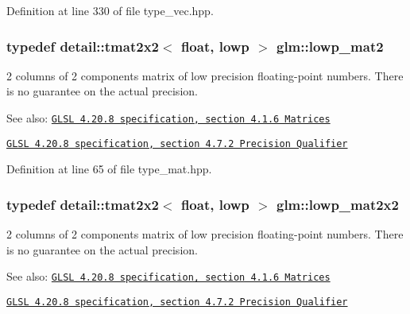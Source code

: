 Definition at line 330 of file type\_\-vec.hpp.\hypertarget{group__core__precision_gc0acc3ccf8da050af3393ea639f698d6}{
\subsubsection[lowp\_\-mat2]{\setlength{\rightskip}{0pt plus 5cm}typedef detail::tmat2x2$<$ float, lowp $>$ {\bf glm::lowp\_\-mat2}}}
\label{group__core__precision_gc0acc3ccf8da050af3393ea639f698d6}


2 columns of 2 components matrix of low precision floating-point numbers. There is no guarantee on the actual precision.

\begin{Desc}
\item[See also:]\href{http://www.opengl.org/registry/doc/GLSLangSpec.4.20.8.pdf}{\tt GLSL 4.20.8 specification, section 4.1.6 Matrices} 

\href{http://www.opengl.org/registry/doc/GLSLangSpec.4.20.8.pdf}{\tt GLSL 4.20.8 specification, section 4.7.2 Precision Qualifier} \end{Desc}


Definition at line 65 of file type\_\-mat.hpp.\hypertarget{group__core__precision_g7d7e123d953978cc17de6882bb10400e}{
\subsubsection[lowp\_\-mat2x2]{\setlength{\rightskip}{0pt plus 5cm}typedef detail::tmat2x2$<$ float, lowp $>$ {\bf glm::lowp\_\-mat2x2}}}
\label{group__core__precision_g7d7e123d953978cc17de6882bb10400e}


2 columns of 2 components matrix of low precision floating-point numbers. There is no guarantee on the actual precision.

\begin{Desc}
\item[See also:]\href{http://www.opengl.org/registry/doc/GLSLangSpec.4.20.8.pdf}{\tt GLSL 4.20.8 specification, section 4.1.6 Matrices} 

\href{http://www.opengl.org/registry/doc/GLSLangSpec.4.20.8.pdf}{\tt GLSL 4.20.8 specification, section 4.7.2 Precision Qualifier} \end{Desc}


